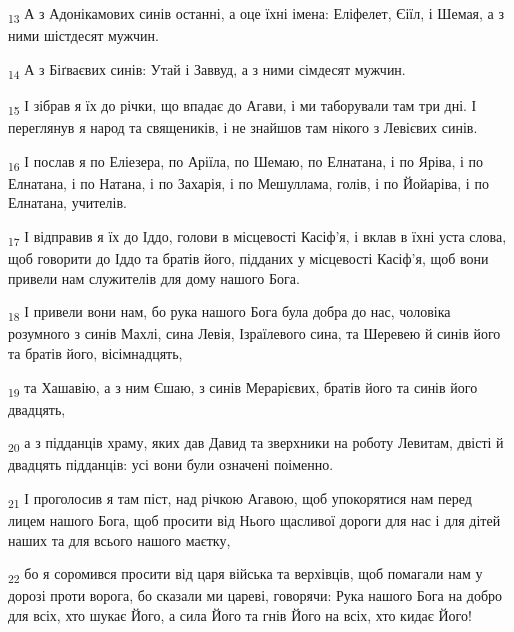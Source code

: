 \begin{tcolorbox}
\textsubscript{13} А з Адонікамових синів останні, а оце їхні імена: Еліфелет, Єіїл, і Шемая, а з ними шістдесят мужчин.
\end{tcolorbox}
\begin{tcolorbox}
\textsubscript{14} А з Біґваєвих синів: Утай і Заввуд, а з ними сімдесят мужчин.
\end{tcolorbox}
\begin{tcolorbox}
\textsubscript{15} І зібрав я їх до річки, що впадає до Агави, і ми таборували там три дні. І переглянув я народ та священиків, і не знайшов там нікого з Левієвих синів.
\end{tcolorbox}
\begin{tcolorbox}
\textsubscript{16} І послав я по Еліезера, по Аріїла, по Шемаю, по Елнатана, і по Яріва, і по Елнатана, і по Натана, і по Захарія, і по Мешуллама, голів, і по Йойаріва, і по Елнатана, учителів.
\end{tcolorbox}
\begin{tcolorbox}
\textsubscript{17} І відправив я їх до Іддо, голови в місцевості Касіф'я, і вклав в їхні уста слова, щоб говорити до Іддо та братів його, підданих у місцевості Касіф'я, щоб вони привели нам служителів для дому нашого Бога.
\end{tcolorbox}
\begin{tcolorbox}
\textsubscript{18} І привели вони нам, бо рука нашого Бога була добра до нас, чоловіка розумного з синів Махлі, сина Левія, Ізраїлевого сина, та Шеревею й синів його та братів його, вісімнадцять,
\end{tcolorbox}
\begin{tcolorbox}
\textsubscript{19} та Хашавію, а з ним Єшаю, з синів Мерарієвих, братів його та синів його двадцять,
\end{tcolorbox}
\begin{tcolorbox}
\textsubscript{20} а з підданців храму, яких дав Давид та зверхники на роботу Левитам, двісті й двадцять підданців: усі вони були означені поіменно.
\end{tcolorbox}
\begin{tcolorbox}
\textsubscript{21} І проголосив я там піст, над річкою Агавою, щоб упокорятися нам перед лицем нашого Бога, щоб просити від Нього щасливої дороги для нас і для дітей наших та для всього нашого маєтку,
\end{tcolorbox}
\begin{tcolorbox}
\textsubscript{22} бо я соромився просити від царя війська та верхівців, щоб помагали нам у дорозі проти ворога, бо сказали ми цареві, говорячи: Рука нашого Бога на добро для всіх, хто шукає Його, а сила Його та гнів Його на всіх, хто кидає Його!
\end{tcolorbox}
